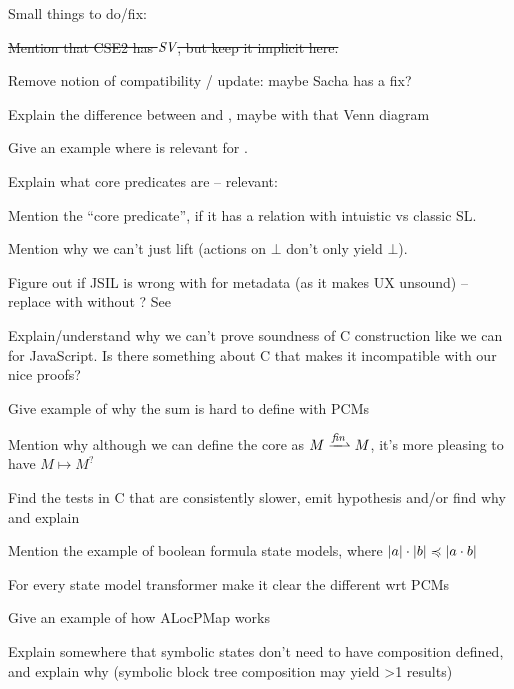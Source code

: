 Small things to do/fix: \begin{compactitem}
 \item \sout{Mention that CSE2 has $\textit{SV}$, but keep it implicit here.}
 \item Remove notion of compatibility / update: maybe Sacha has a fix?
 \item Explain the difference between \LFail{} and \Err{}, maybe with that Venn diagram
 \item Give an example where \Miss{} is relevant for \consume.
 \item Explain what core predicates are -- relevant: \cite{abstractseplogic}
 \item Mention the  ``core predicate'', if it has a relation with intuistic vs classic SL.
 \item Mention why we can't just lift \execac{} (actions on $\bot$ don't only yield $\bot$).
 \item Figure out if JSIL is wrong with \Ag{} for metadata (as it makes  UX unsound) -- replace with \Frac{} without \store{}? See \cite{towardsjs}
 \item Explain/understand why we can't prove soundness of C construction like we can for JavaScript. Is there something about C that makes it incompatible with our nice proofs?
 \item Give example of why the sum is hard to define with PCMs
 \item Mention why although we can define the core as $M\finmap M$, it's more pleasing to have $M\mapsto M^?$
 \item Find the tests in C that are consistently slower, emit hypothesis and/or find why and explain
 \item Mention the example of boolean formula state models, where $|a| \cdot |b| \preccurlyeq |a\cdot b|$
 \item For every state model transformer make it clear the different wrt PCMs
 \item Give an example of how ALocPMap works
 \item Explain somewhere that symbolic states don't need to have composition defined, and explain why (symbolic block tree composition may yield >1 results)
 \end{compactitem}

